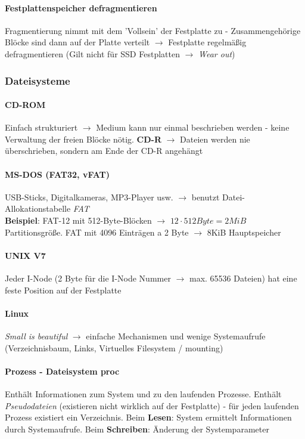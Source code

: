 \documentclass[11pt,a4paper,landscape]{article}
\begin{document}
\begin{multicols*}{3}
	\paragraph{Festplattenspeicher defragmentieren} Fragmentierung nimmt mit dem 'Vollsein' der Festplatte zu - Zusammengehörige Blöcke sind dann auf der Platte verteilt $\rightarrow$ Festplatte regelmäßig defragmentieren (Gilt nicht für SSD Festplatten $\rightarrow$ \textit{Wear out})
	\subsubsection{Dateisysteme}
	\paragraph{CD-ROM} Einfach strukturiert $\rightarrow$ Medium kann nur einmal beschrieben werden - keine Verwaltung der freien Blöcke nötig. \textbf{CD-R} $\rightarrow$ Dateien werden nie überschrieben, sondern am Ende der CD-R angehängt
	\paragraph{MS-DOS (FAT32, vFAT)} USB-Sticks, Digitalkameras, MP3-Player usw. $\rightarrow$ benutzt Datei-Allokationstabelle \textit{FAT}\\
	\textbf{Beispiel}: FAT-12 mit 512-Byte-Blöcken $\rightarrow$ $12 \cdot 512 Byte = 2MiB$ Partitionsgröße. FAT mit 4096 Einträgen a 2 Byte $\rightarrow$ 8KiB Hauptspeicher
	\paragraph{UNIX V7} Jeder I-Node (2 Byte für die I-Node Nummer $\rightarrow$ max. 65536 Dateien) hat eine feste Position auf der Festplatte
	\paragraph{Linux} \textit{Small is beautiful} $\rightarrow$ einfache Mechanismen und wenige Systemaufrufe (Verzeichnisbaum, Links, Virtuelles Filesystem / mounting)
	\paragraph{Prozess - Dateisystem proc} Enthält Informationen zum System und zu den laufenden Prozesse. Enthält \textit{Pseudodateien} (existieren nicht wirklich auf der Festplatte) - für jeden laufenden Prozess existiert ein Verzeichnis. Beim \textbf{Lesen}: System ermittelt Informationen durch Systemaufrufe. Beim \textbf{Schreiben}: Änderung der Systemparameter

\end{multicols*}
\end{document}
